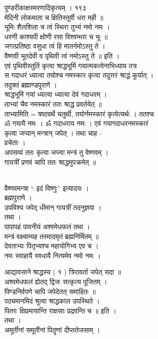 \documentclass[11pt, openany]{book}
\begin{document}
{ }{ पुण्डरीकाक्षस्मरणादिकृत्यम् । १९३}{\\
मेदिनी लोकमाता च क्षितिस्तूर्वी धरा मही ॥\\
भूमिः शैलशिला च त्वं स्थिरा तुभ्यं नमो नमः ।\\
धरणी काश्यपी क्षोणी रसा विश्वम्भरा च भूः ॥\\
जगत्प्रतिष्ठा वसुधा त्वं हि मातर्नमोऽस्तु ते ।\\
वैष्णवी भूतदेवी व पृथिवी त्वं नमोऽस्तु ते ॥ इति ।\\
एवं पृथिवीस्तुतिं कृत्वा श्राद्धभूमिं गयात्मकत्वेनाभिध्याय तत्र\\
स गदाधरं ध्यात्वा तयोश्च नमस्कार कृत्वा तदुत्तरं श्राद्धं कुर्यात् ।\\
तदुक्तं ब्रह्माण्डपुराणे ।\\
श्राद्धभूमिं गयां ध्यात्वा ध्यात्वा देवं गदाधरम् ।\\
ताभ्यां चैव नमस्कारं ततः श्राद्ध प्रवर्तयेत् ॥\\
ताभ्यामिति = षष्ठ्यर्थे चतुर्थी, तयोर्नमस्कारं कृत्वेत्यर्थः । ततश्च\\
ॐ गयायै नमः । ॐ गदाधराय नमः । एवं गयागदाधरनमस्कारं\\
कृत्वा जप्यान् मन्त्रान् जपेत् । तथा चाह -\\
प्रचेताः ।\\
अपसव्यं ततः कृत्वा जप्त्वा मन्त्रं तु वेष्णवम् ।\\
गायत्रीं प्रणवं चापि ततः श्राद्धमुपक्रमेत् }{॥}{\\
वैष्णवमन्त्रा `` इदं विष्णुः'' इत्यादयः ।\\
ब्रह्मपुराणे ।\\
उपविश्य जपेद् धीमान् गायत्रीं तदनुज्ञया ।\\
तथा ।\\
पापापहं पावनीयं अश्वमेधफलं तथा ।\\
मन्त्रं वक्ष्याम्यह तस्मादमृतं ब्रह्मनिर्मितम् ॥\\
देवताभ्यः पितृभ्यश्च महायोगिभ्य एव च ।\\
नमः स्वाहायै स्वधायै नित्यमेव नमो नमः ।

{आद्यावसाने श्राद्धस्य ( १ ) त्रिरावर्ता जपेत् सदा ॥\\
अश्वमेधफलं ह्येतद् द्विजः सत्कृत्य पूजितम् ।\\
पिण्डनिर्वपणे चापि जपेदेतत् समाहितः ॥\\
पठ्यमानमिदं श्रुत्वा श्राद्धकाल उपस्थिते ।\\
पितरः क्षिप्रमायान्ति राक्षसाः प्रद्रवन्ति च ॥ इति ।\\
तथा ।\\
अमूर्तीनां समूर्तीनां पितॄणां दीप्ततेजसाम् ।

}}
\end{document}
